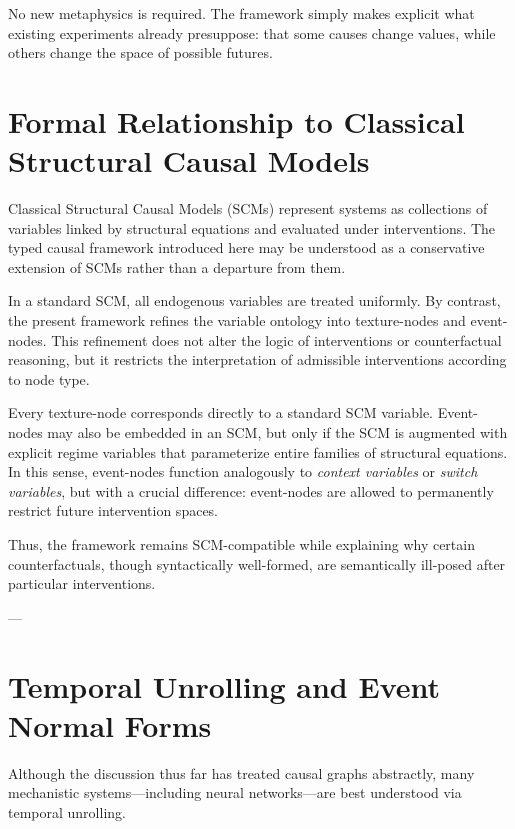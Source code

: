 \documentclass[11pt]{article}
\theoremstyle{remark}
\begin{document}
No new metaphysics is required. The framework simply makes explicit what existing experiments already presuppose: that some causes change values, while others change the space of possible futures.

\section{Formal Relationship to Classical Structural Causal Models}

Classical Structural Causal Models (SCMs) represent systems as collections of variables linked by structural equations and evaluated under interventions. The typed causal framework introduced here may be understood as a conservative extension of SCMs rather than a departure from them.

In a standard SCM, all endogenous variables are treated uniformly. By contrast, the present framework refines the variable ontology into texture-nodes and event-nodes. This refinement does not alter the logic of interventions or counterfactual reasoning, but it restricts the interpretation of admissible interventions according to node type.

Every texture-node corresponds directly to a standard SCM variable. Event-nodes may also be embedded in an SCM, but only if the SCM is augmented with explicit regime variables that parameterize entire families of structural equations. In this sense, event-nodes function analogously to \emph{context variables} or \emph{switch variables}, but with a crucial difference: event-nodes are allowed to permanently restrict future intervention spaces.

Thus, the framework remains SCM-compatible while explaining why certain counterfactuals, though syntactically well-formed, are semantically ill-posed after particular interventions.

---

\section{Temporal Unrolling and Event Normal Forms}

Although the discussion thus far has treated causal graphs abstractly, many mechanistic systems—including neural networks—are best understood via temporal unrolling.
\end{document}
